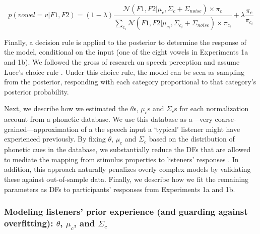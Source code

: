 \documentclass[preprint]{JASA}
\begin{document}
\begin{equation}
 p(vowel = v|F1, F2) = (1-\lambda) \frac{\mathcal{N}(F1, F2| \mu_c, \Sigma_c + \Sigma_{noise}) \times \pi_c}{\sum_{c_i} \mathcal{N}(F1, F2|\mu_{c_i}, \Sigma_{c_i} + \Sigma_{noise}) \times \pi_{c_i}} + \lambda \frac{\pi_c}{\pi_{c_i}} \label{eq:Bayes-rule-ASP}
\end{equation}

Finally, a decision rule is applied to the posterior to determine the response of the model, conditional on the input (one of the eight vowels in Experiments 1a and 1b). We followed the gross of research on speech perception and assume Luce's choice rule \citetext{\citealp{luce1959}; \citealp[for discussion, see][]{massaro-friedman1990}}. Under this choice rule, the model can be seen as sampling from the posterior, responding with each category proportional to that category's posterior probability.

Next, we describe how we estimated the \(\theta\)s, \(\mu_c\)s and \(\Sigma_c\)s for each normalization account from a phonetic database. We use this database as a---very coarse-grained---approximation of a the speech input a `typical' listener might have experienced previously. By fixing \(\theta\), \(\mu_c\) and \(\Sigma_c\) based on the distribution of phonetic cues in the database, we substantially reduce the DFs that are allowed to mediate the mapping from stimulus properties to listeners' responses \citep[following][]{xie2023}. In addition, this approach naturally penalizes overly complex models by validating these against out-of-sample data. Finally, we describe how we fit the remaining parameters as DFs to participants' responses from Experiments 1a and 1b.

\subsubsection{\texorpdfstring{Modeling listeners' prior experience (and guarding against overfitting): \(\theta\), \(\mu_c\), and \(\Sigma_c\)}{Modeling listeners' prior experience (and guarding against overfitting): \textbackslash theta, \textbackslash mu\_c, and \textbackslash Sigma\_c}}\label{modeling-listeners-prior-experience-and-guarding-against-overfitting-theta-mu_c-and-sigma_c}
\end{document}
